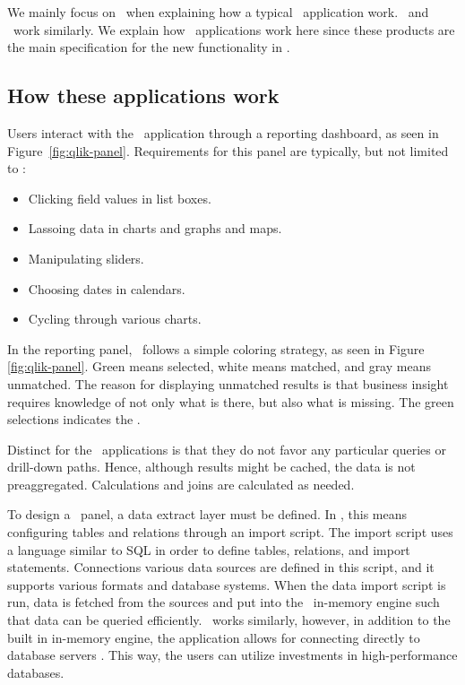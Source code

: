 We mainly focus on \qlikview~when explaining how a typical \bd~application work. \tableau~and \powerpivot~work similarly. We explain how \bd~applications work here since these products are the main specification for the new functionality in \genusSoftware.

\subsection{How these applications work}
\label{sub:How these applications work}
Users interact with the \bd~application through a reporting dashboard, as seen in Figure~\ref{fig:qlik-panel}. Requirements for this panel are typically, but not limited to \cite{Qlik2014-vd}:
\begin{itemize}
  \item Clicking field values in list boxes.
  \item Lassoing data in charts and graphs and maps.
  \item Manipulating sliders.
  \item Choosing dates in calendars.
  \item Cycling through various charts.
\end{itemize}

In the reporting panel, \qlikview~follows a simple coloring strategy, as seen in Figure \ref{fig:qlik-panel}. Green means selected, white means matched, and gray means unmatched. The reason for displaying unmatched results is that business insight requires knowledge of not only what is there, but also what is missing. The green selections indicates the .

Distinct for the \bd~applications is that they do not favor any particular queries or drill-down paths. Hence, although results might be cached, the data is not preaggregated. Calculations and joins are calculated as needed.

To design a \bd~panel, a data extract layer must be defined. In \qlikview, this means configuring tables and relations through an import script. The import script uses a language similar to SQL in order to define tables, relations, and import statements. Connections various data sources are defined in this script, and it supports various formats and database systems. When the data import script is run, data is fetched from the sources and put into the \qlikview~in-memory engine such that data can be queried efficiently. \tableau~works similarly, however, in addition to the built in in-memory engine, the application allows for connecting directly to database servers \cite{Kamkolkar2015-iq}. This way, the users can utilize investments in high-performance databases. 

